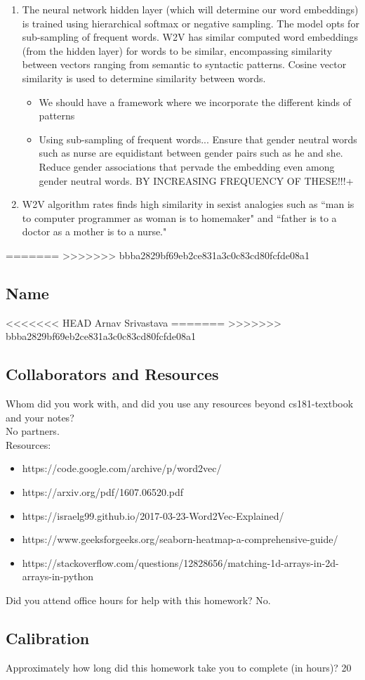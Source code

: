 \documentclass[submit]{harvardml}
\begin{document}
\begin{enumerate}
\begin{itemize}
    \end{itemize}
    \item The neural network hidden layer (which will determine our word embeddings) is trained using hierarchical softmax or negative sampling. The model opts for sub-sampling of frequent words. W2V has similar computed word embeddings (from the hidden layer) for words to be similar, encompassing similarity between vectors ranging from semantic to syntactic patterns. Cosine vector similarity is used to determine similarity between words.
    \begin{itemize}
        \item We should have a framework where we incorporate the different kinds of patterns 
        \item Using sub-sampling of frequent words...  Ensure that gender neutral words such as nurse are equidistant between gender pairs such as he and she. Reduce gender associations that pervade the embedding even among gender neutral words. BY INCREASING FREQUENCY OF THESE!!!+
    \end{itemize}
    \item W2V algorithm rates finds high similarity in sexist analogies such as ``man is to
computer programmer as woman is to homemaker" and ``father is to a doctor as a mother is to a nurse."

\end{enumerate}
=======
>>>>>>> bbba2829bf69eb2ce831a3c0c83cd80fcfde08a1
\newpage
\subsection*{Name}
<<<<<<< HEAD
Arnav Srivastava
=======
>>>>>>> bbba2829bf69eb2ce831a3c0c83cd80fcfde08a1
\subsection*{Collaborators and Resources}
Whom did you work with, and did you use any resources beyond cs181-textbook and your notes?\\
No partners.
\\
Resources:
\begin{itemize}
    \item https://code.google.com/archive/p/word2vec/
    \item https://arxiv.org/pdf/1607.06520.pdf
    \item https://israelg99.github.io/2017-03-23-Word2Vec-Explained/ 
    \item https://www.geeksforgeeks.org/seaborn-heatmap-a-comprehensive-guide/
    \item https://stackoverflow.com/questions/12828656/matching-1d-arrays-in-2d-arrays-in-python
\end{itemize}
Did you attend office hours for help with this homework?
No.
\subsection*{Calibration}
Approximately how long did this homework take you to complete (in hours)? 
20
\end{document}
